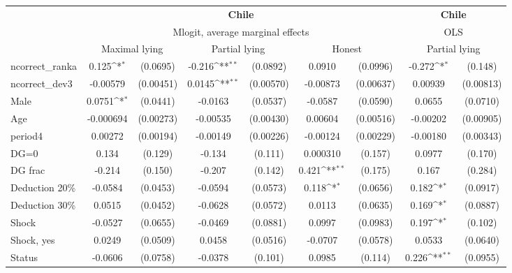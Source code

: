 \def\sym#1{\ifmmode^{#1}\else\(^{#1}\)\fi}
\begin{tabular}{l|cccccc|cc}
\hline\hline
&\multicolumn{6}{c|}{\bf Chile}&\multicolumn{2}{c}{\bf Chile}\\ &\multicolumn{6}{c|}{Mlogit, average marginal effects }&\multicolumn{2}{c}{OLS}\\
                &\multicolumn{2}{c}{Maximal lying}&\multicolumn{2}{c}{Partial lying}&\multicolumn{2}{c}{Honest}  &\multicolumn{2}{c}{Partial lying}\\
\hline
ncorrect\_ranka  &    0.125\sym{*}  & (0.0695)&   -0.216\sym{**} & (0.0892)&   0.0910         & (0.0996)&   -0.272\sym{*}  &  (0.148)\\
ncorrect\_dev3   & -0.00579         &(0.00451)&   0.0145\sym{**} &(0.00570)& -0.00873         &(0.00637)&  0.00939         &(0.00813)\\
Male            &   0.0751\sym{*}  & (0.0441)&  -0.0163         & (0.0537)&  -0.0587         & (0.0590)&   0.0655         & (0.0710)\\
Age             &-0.000694         &(0.00273)& -0.00535         &(0.00430)&  0.00604         &(0.00516)& -0.00202         &(0.00905)\\
period4         &  0.00272         &(0.00194)& -0.00149         &(0.00226)& -0.00124         &(0.00229)& -0.00180         &(0.00343)\\
DG=0          &    0.134         &  (0.129)&   -0.134         &  (0.111)& 0.000310         &  (0.157)&   0.0977         &  (0.170)\\
DG frac         &   -0.214         &  (0.150)&   -0.207         &  (0.142)&    0.421\sym{**} &  (0.175)&    0.167         &  (0.284)\\
Deduction 20\%&  -0.0584         & (0.0453)&  -0.0594         & (0.0573)&    0.118\sym{*}  & (0.0656)&    0.182\sym{*}  & (0.0917)\\
Deduction 30\%&   0.0515         & (0.0452)&  -0.0628         & (0.0572)&   0.0113         & (0.0635)&    0.169\sym{*}  & (0.0887)\\
Shock         &  -0.0527         & (0.0655)&  -0.0469         & (0.0881)&   0.0997         & (0.0983)&    0.197\sym{*}  &  (0.102)\\
Shock, yes    &   0.0249         & (0.0509)&   0.0458         & (0.0516)&  -0.0707         & (0.0578)&   0.0533         & (0.0640)\\
Status        &  -0.0606         & (0.0758)&  -0.0378         &  (0.101)&   0.0985         &  (0.114)&    0.226\sym{**} & (0.0955)\\

\end{tabular}
